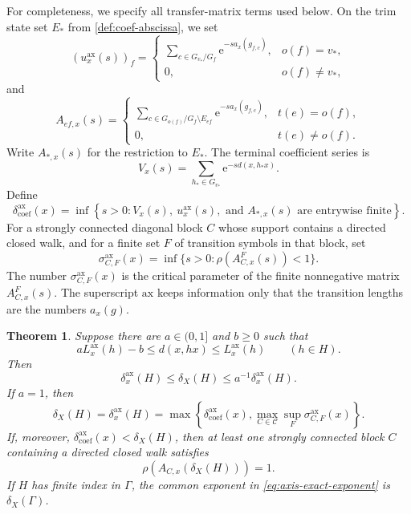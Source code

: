 \documentclass[11pt]{article}
\newtheorem{theorem}{Theorem}[section]
\theoremstyle{definition}
\newcommand{\coef}{\mathrm{coef}}
\newcommand{\ax}{\mathrm{ax}}
\newcommand{\e}{\mathrm e}
\begin{document}
For completeness, we specify all transfer-matrix terms used below.  On the trim state set
$E_*$ from \cref{def:coef-abscissa},  we set
\[
 (u^{\ax}_x(s))_f=
 \begin{cases}
 \displaystyle\sum_{c\in G_{v_*}/G_f}\e^{-s a_x(g_{f,c})},&o(f)=v_*,\\[1.2ex]
 0,&o(f)\ne v_*,
 \end{cases}
\]
and
\begin{equation}\label{eq:full-comparison-matrix}
 A_{ef,x}(s)=
 \begin{cases}
 \displaystyle\sum_{c\in G_{o(f)}/G_f\setminus E_{ef}}
 \e^{-s a_x(g_{f,c})},&t(e)=o(f),\\[1.2ex]
 0,&t(e)\ne o(f).
 \end{cases}
\end{equation}
Write $A_{*,x}(s)$ for the restriction to $E_*$.  The terminal coefficient series is
\[
 V_x(s)=\sum_{h_*\in G_{v_*}}\e^{-sd(x,h_*x)}.
\]
Define
\begin{equation}\label{eq:axis-coefficient-abscissa}
 \delta^{\ax}_{\coef}(x)=
 \inf\left\{s>0:
 V_x(s),\ u^{\ax}_x(s),\text{ and }A_{*,x}(s)
 \text{ are entrywise finite}\right\}.
\end{equation}
For a strongly connected diagonal block $C$ whose support contains a directed closed walk,
and for a finite set $F$ of transition symbols in that block, set
\begin{equation}\label{eq:axis-finite-critical-parameter}
 \sigma^{\ax}_{C,F}(x)=
 \inf\{s>0:\rho(A^F_{C,x}(s))<1\}.
\end{equation}
The number $\sigma^{\ax}_{C,F}(x)$ is the critical parameter of the finite nonnegative
matrix $A^F_{C,x}(s)$.  The superscript $\ax$ keeps information only that the transition lengths are the
numbers $a_x(g)$.

\begin{theorem}
\label{thm:axis-bound-cancellation}
Suppose there are $a\in(0,1]$ and $b\ge0$ such that
\begin{equation}\label{eq:axis-bound-cancellation}
 aL^{\ax}_x(h)-b\le d(x,hx)\le L^{\ax}_x(h)
 \qquad(h\in H).
\end{equation}
Then
\begin{equation}\label{eq:axis-exponent-comparison}
 \delta^{\ax}_x(H)\le\delta_X(H)\le a^{-1}\delta^{\ax}_x(H).
\end{equation}
If $a=1$, then
\begin{equation}\label{eq:axis-exact-exponent}
 \delta_X(H)=\delta^{\ax}_x(H)
 =\max\left\{\delta^{\ax}_{\coef}(x),
 \max_{C\in\mathscr C}\sup_F\sigma^{\ax}_{C,F}(x)\right\}.
\end{equation}
If, moreover, $\delta^{\ax}_{\coef}(x)<\delta_X(H)$, then at least one strongly connected
block $C$ containing a directed closed walk satisfies
\begin{equation}\label{eq:axis-critical-rho-one}
 \rho(A_{C,x}(\delta_X(H)))=1.
\end{equation}
If $H$ has finite index in $\Gamma$, the common exponent in
\eqref{eq:axis-exact-exponent} is $\delta_X(\Gamma)$.
\end{theorem}
\end{document}
